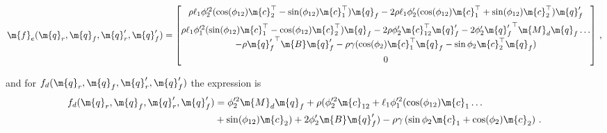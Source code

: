 \begin{small}
  \begin{equation*}
    \m{f}_e(\m{q}_{r}, \m{q}_{f}^{\phantom{\prime}}, \m{q}_{r}^\prime, \m{q}_{f}^\prime) = \begin{bmatrix}
        \rho \ell_1 \phi_2^{\prime2}(\cos(\phi_{12})\m{c}_2^\top - \sin(\phi_{12})\m{c}_1^\top) \m{q}_{f}-2 \rho \ell_1 \phi_2^\prime(\cos(\phi_{12})\m{c}_1^\top + \sin(\phi_{12})\m{c}_2^\top) \m{q}_{f}^\prime \\[0.5em]
        \rho \ell_1 \phi_1^{\prime2}(\sin(\phi_{12})\m{c}_1^\top - \cos(\phi_{12})\m{c}_2^\top) \m{q}_{f}-2 \rho \phi_2^\prime \m{c}_{12}^\top \m{q}_{f}^\prime-2 \phi_2^\prime {\m{q}_{f}^\prime}^\top \m{M}_{d} \m{q}_{f}^{\phantom{\prime}} \dots\\
        -\rho {\m{q}_{f}^\prime}^\top \m{B} \m{q}_{f}^\prime - \rho \gamma(\cos(\phi_2) \m{c}_1^\top \m{q}_{f}^{\phantom{\prime}} - \sin \phi_2 \m{c}_2^\top \m{q}_{f}^{\phantom{\prime}}) \\[0.5em]
        0
    \end{bmatrix} \, \text{,}
  \end{equation*}
\end{small}
%
and for $f_{d}(\m{q}_{r}, \m{q}_{f}^{\phantom{\prime}}, \m{q}_{r}^\prime, \m{q}_{f}^\prime)$ the expression is
%
\begin{align*}
  f_{d}(\m{q}_{r}, \m{q}_{f}^{\phantom{\prime}}, \m{q}_{r}^\prime, \m{q}_{f}^\prime) &= \phi_2^{\prime2} \m{M}_{d} \m{q}_{f}+\rho(\phi_2^{\prime2} \m{c}_{12}+\ell_1 \phi_1^{\prime2}(\cos(\phi_{12}) \m{c}_1 \dots \\
  &+ \sin(\phi_{12}) \m{c}_2)+2 \phi_2^\prime \m{B} \m{q}_{f}^\prime)-\rho \gamma\left(\sin \phi_2 \m{c}_1+\cos(\phi_2) \m{c}_2\right) \, \text{.}
\end{align*}

